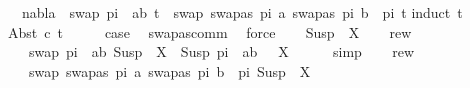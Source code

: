 \begin{isabellebody}
\ \ \ {\isachardoublequoteopen}nabla\ {\isasymturnstile}\ {\isacharparenleft}{\kern0pt}swap\ {\isacharparenleft}{\kern0pt}pi\ {\isacharat}{\kern0pt}\ {\isacharbrackleft}{\kern0pt}{\isacharparenleft}{\kern0pt}a{\isacharcomma}{\kern0pt}b{\isacharparenright}{\kern0pt}{\isacharbrackright}{\kern0pt}{\isacharparenright}{\kern0pt}\ t{\isacharparenright}{\kern0pt}\ {\isasymapprox}\ {\isacharparenleft}{\kern0pt}swap\ {\isacharparenleft}{\kern0pt}{\isacharbrackleft}{\kern0pt}{\isacharparenleft}{\kern0pt}swapas\ pi\ a{\isacharcomma}{\kern0pt}\ swapas\ pi\ b{\isacharparenright}{\kern0pt}{\isacharbrackright}{\kern0pt}\ {\isacharat}{\kern0pt}\ pi{\isacharparenright}{\kern0pt}\ t{\isacharparenright}{\kern0pt}{\isachardoublequoteclose}\isanewline
%
\isadelimproof
%
\endisadelimproof
%
\isatagproof
{}\isamarkupfalse%
{\isacharparenleft}{\kern0pt}induct\ t{\isacharparenright}{\kern0pt}\isanewline
\ \ \isamarkupfalse%
\ {\isacharparenleft}{\kern0pt}Abst\ c\ t{\isacharparenright}{\kern0pt}\isanewline
\ \ \isamarkupfalse%
\ \isamarkupfalse%
\ {\isacharquery}{\kern0pt}case\ \isamarkupfalse%
\ swapas{\isacharunderscore}{\kern0pt}comm\ \isamarkupfalse%
\ force\isanewline
{}\isamarkupfalse%
\isanewline
\ \ \isamarkupfalse%
\ {\isacharparenleft}{\kern0pt}Susp\ {\isasympi}{\isacharprime}{\kern0pt}\ X{\isacharparenright}{\kern0pt}\isanewline
\ \ \isamarkupfalse%
\ rew{}{\isacharcolon}{\kern0pt}\isanewline
\ \ \ \ {\isachardoublequoteopen}swap\ {\isacharparenleft}{\kern0pt}pi\ {\isacharat}{\kern0pt}\ {\isacharbrackleft}{\kern0pt}{\isacharparenleft}{\kern0pt}a{\isacharcomma}{\kern0pt}b{\isacharparenright}{\kern0pt}{\isacharbrackright}{\kern0pt}{\isacharparenright}{\kern0pt}\ {\isacharparenleft}{\kern0pt}Susp\ {\isasympi}{\isacharprime}{\kern0pt}\ X{\isacharparenright}{\kern0pt}\ {\isacharequal}{\kern0pt}\ Susp\ {\isacharparenleft}{\kern0pt}pi\ {\isacharat}{\kern0pt}\ {\isacharbrackleft}{\kern0pt}{\isacharparenleft}{\kern0pt}a{\isacharcomma}{\kern0pt}b{\isacharparenright}{\kern0pt}{\isacharbrackright}{\kern0pt}\ {\isacharat}{\kern0pt}\ {\isasympi}{\isacharprime}{\kern0pt}{\isacharparenright}{\kern0pt}\ X{\isachardoublequoteclose}\isanewline
\ \ \ \ \isamarkupfalse%
\ simp\isanewline
\ \ \isamarkupfalse%
\ rew{}{\isacharcolon}{\kern0pt}\isanewline
\ \ \ \ {\isachardoublequoteopen}swap\ {\isacharparenleft}{\kern0pt}{\isacharbrackleft}{\kern0pt}{\isacharparenleft}{\kern0pt}swapas\ pi\ a{\isacharcomma}{\kern0pt}\ swapas\ pi\ b{\isacharparenright}{\kern0pt}{\isacharbrackright}{\kern0pt}\ {\isacharat}{\kern0pt}\ pi{\isacharparenright}{\kern0pt}\ {\isacharparenleft}{\kern0pt}Susp\ {\isasympi}{\isacharprime}{\kern0pt}\ X{\isacharparenright}{\kern0pt}\ \isanewline

\end{isabellebody}
